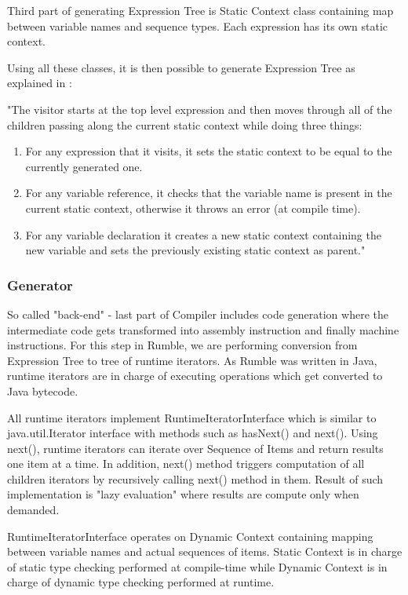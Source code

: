 Third part of generating Expression Tree is Static Context class containing map between variable names and sequence types. Each expression has its own static context.

Using all these classes, it is then possible to generate Expression Tree as explained in \cite{RumbleThesis}: 

"The visitor starts at the top level expression and then moves through all of the children passing along the current static context while doing three things:
\begin{enumerate}
	\item For any expression that it visits, it sets the static context to be equal to the currently generated one.
	\item For any variable reference, it checks that the variable name is present in the current static context, otherwise it throws an error (at compile time).
	\item For any variable declaration it creates a new static context containing the new variable and sets the previously existing static context as parent."
\end{enumerate}



\subsubsection{Generator}
So called "back-end" - last part of Compiler includes code generation where the intermediate code gets transformed into assembly instruction and finally machine instructions. For this step in Rumble, we are performing conversion from Expression Tree to tree of runtime iterators. As Rumble was written in Java, runtime iterators are in charge of executing operations which get converted to Java bytecode.

All runtime iterators implement RuntimeIteratorInterface which is similar to java.util.Iterator interface with methods such as hasNext() and next(). Using next(), runtime iterators can iterate over Sequence of Items and return results one item at a time. In addition, next() method triggers computation of all children iterators by recursively calling next() method in them. Result of such implementation is "lazy evaluation" where results are compute only when demanded. 

RuntimeIteratorInterface operates on Dynamic Context containing mapping between variable names and actual sequences of items. Static Context is in charge of static type checking performed at compile-time while Dynamic Context is in charge of dynamic type checking performed at runtime.

